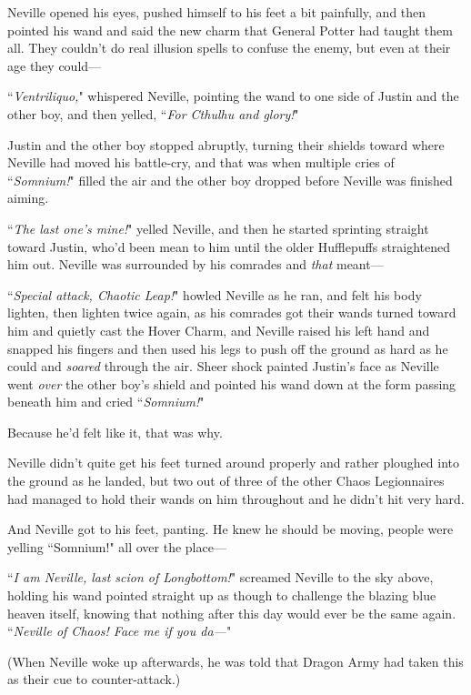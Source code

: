 Neville opened his eyes, pushed himself to his feet a bit painfully, and then pointed his wand and said the new charm that General Potter had taught them all. They couldn't do real illusion spells to confuse the enemy, but even at their age they could—

``\emph{Ventriliquo,}" whispered Neville, pointing the wand to one side of Justin and the other boy, and then yelled, ``\emph{For Cthulhu and glory!}"

Justin and the other boy stopped abruptly, turning their shields toward where Neville had moved his battle-cry, and that was when multiple cries of ``\emph{Somnium!}" filled the air and the other boy dropped before Neville was finished aiming.

``\emph{The last one's mine!}" yelled Neville, and then he started sprinting straight toward Justin, who'd been mean to him until the older Hufflepuffs straightened him out. Neville was surrounded by his comrades and \emph{that} meant—

``\emph{Special attack, Chaotic Leap!}" howled Neville as he ran, and felt his body lighten, then lighten twice again, as his comrades got their wands turned toward him and quietly cast the Hover Charm, and Neville raised his left hand and snapped his fingers and then used his legs to push off the ground as hard as he could and \emph{soared} through the air. Sheer shock painted Justin's face as Neville went \emph{over} the other boy's shield and pointed his wand down at the form passing beneath him and cried ``\emph{Somnium!}"

Because he'd felt like it, that was why.

Neville didn't quite get his feet turned around properly and rather ploughed into the ground as he landed, but two out of three of the other Chaos Legionnaires had managed to hold their wands on him throughout and he didn't hit very hard.

And Neville got to his feet, panting. He knew he should be moving, people were yelling ``Somnium!" all over the place—

``\emph{I am Neville, last scion of Longbottom!}" screamed Neville to the sky above, holding his wand pointed straight up as though to challenge the blazing blue heaven itself, knowing that nothing after this day would ever be the same again. ``\emph{Neville of Chaos! Face me if you da—}"

(When Neville woke up afterwards, he was told that Dragon Army had taken this as their cue to counter-attack.)

